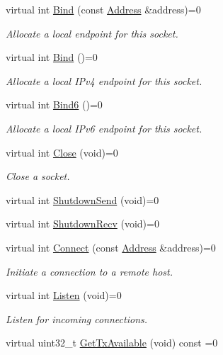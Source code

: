 \begin{DoxyCompactItemize}
virtual int \hyperlink{classns3_1_1Socket_ada93439a43de2028b5a8fc6621dad482}{Bind} (const \hyperlink{classns3_1_1Address}{Address} \&address)=0
\begin{DoxyCompactList}\small\item\em Allocate a local endpoint for this socket. \end{DoxyCompactList}\item 
virtual int \hyperlink{classns3_1_1Socket_a680c1edd8b3ec3adf4085e1ded1e8a0d}{Bind} ()=0
\begin{DoxyCompactList}\small\item\em Allocate a local I\+Pv4 endpoint for this socket. \end{DoxyCompactList}\item 
virtual int \hyperlink{classns3_1_1Socket_a68a4f2bcd38dec94d5a6fd4d867a1f19}{Bind6} ()=0
\begin{DoxyCompactList}\small\item\em Allocate a local I\+Pv6 endpoint for this socket. \end{DoxyCompactList}\item 
virtual int \hyperlink{classns3_1_1Socket_abdac6e2498c5aa2963ef361d4200ddf3}{Close} (void)=0
\begin{DoxyCompactList}\small\item\em Close a socket. \end{DoxyCompactList}\item 
virtual int \hyperlink{classns3_1_1Socket_a8186c87627fa3ece326d8f1c822d7f95}{Shutdown\+Send} (void)=0
\item 
virtual int \hyperlink{classns3_1_1Socket_a5a6b835bb7ccf2cf43b54912e7cae600}{Shutdown\+Recv} (void)=0
\item 
virtual int \hyperlink{classns3_1_1Socket_a97f08aaf37b8fd7d4b5cad4dfdd4022a}{Connect} (const \hyperlink{classns3_1_1Address}{Address} \&address)=0
\begin{DoxyCompactList}\small\item\em Initiate a connection to a remote host. \end{DoxyCompactList}\item 
virtual int \hyperlink{classns3_1_1Socket_a6b3529a32632cf1a56debf5f79e56c54}{Listen} (void)=0
\begin{DoxyCompactList}\small\item\em Listen for incoming connections. \end{DoxyCompactList}\item 
virtual uint32\+\_\+t \hyperlink{classns3_1_1Socket_ae7cf62e3acf44106bfa1d40eaeaec151}{Get\+Tx\+Available} (void) const =0

\end{DoxyCompactItemize}
